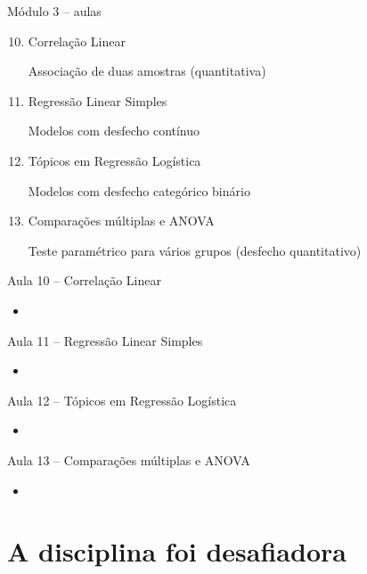 \documentclass{beamer}
\begin{document}
\begin{frame}{\scriptsize Módulo 3 -- aulas}
  \begin{enumerate}
    \setcounter{enumi}{9}
  \item Correlação Linear

    {\tiny Associação de duas amostras (quantitativa)}
    \bigskip
  \item Regressão Linear Simples

    {\tiny Modelos com desfecho contínuo}
    \bigskip
  \item Tópicos em Regressão Logística

    {\tiny Modelos com desfecho categórico binário}
    \bigskip
  \item Comparações múltiplas e ANOVA

    {\tiny Teste paramétrico para vários grupos (desfecho quantitativo)}
  \end{enumerate}
\end{frame}

\begin{frame}{\scriptsize Aula 10 -- Correlação Linear}
  \begin{itemize}
  \item 
  \end{itemize}
\end{frame}

\begin{frame}{\scriptsize Aula 11 -- Regressão Linear Simples}
  \begin{itemize}
  \item 
  \end{itemize}
\end{frame}

\begin{frame}{\scriptsize Aula 12 -- Tópicos em Regressão Logística}
  \begin{itemize}
  \item 
  \end{itemize}
\end{frame}

\begin{frame}{\scriptsize Aula 13 -- Comparações múltiplas e ANOVA}
  \begin{itemize}
  \item 
  \end{itemize}
\end{frame}

\section{A disciplina foi desafiadora}
\end{document}
